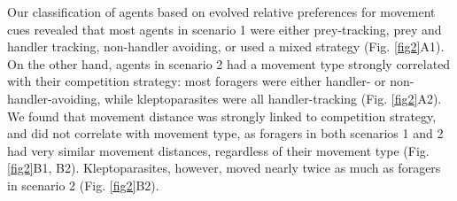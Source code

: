     
    Our classification of agents based on evolved relative preferences for movement cues revealed that most agents in scenario 1 were either prey-tracking, prey and handler tracking, non-handler avoiding, or used a mixed strategy (Fig. \ref{fig2}A1).
    On the other hand, agents in scenario 2 had a movement type strongly correlated with their competition strategy: most foragers were either handler- or non-handler-avoiding, while kleptoparasites were all handler-tracking (Fig. \ref{fig2}A2).
    We found that movement distance was strongly linked to competition strategy, and did not correlate with movement type, as foragers in both scenarios 1 and 2 had very similar movement distances, regardless of their movement type (Fig. \ref{fig2}B1, B2).
    Kleptoparasites, however, moved nearly twice as much as foragers in scenario 2 (Fig. \ref{fig2}B2).
    
